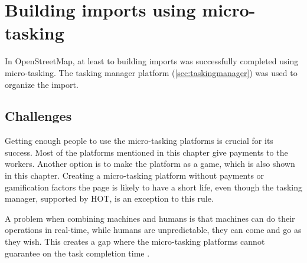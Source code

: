 
\section{Building imports using micro-tasking}
In OpenStreetMap, at least to building imports was successfully completed using micro-tasking. The tasking manager platform (\ref{sec:taskingmanager}) was used to organize the import. 


\subsection{Challenges}
Getting enough people to use the micro-tasking platforms is crucial for its success. Most of the platforms mentioned in this chapter give payments to the workers. Another option is to make the platform as a game, which is also shown in this chapter. Creating a micro-tasking platform without payments or gamification factors the page is likely to have a short life, even though the tasking manager, supported by HOT, is an exception to this rule. 

A problem when combining machines and humans is that machines can do their operations in real-time, while humans are unpredictable, they can come and go as they wish. This creates a gap where the micro-tasking platforms cannot guarantee on the task completion time \citep{Difallah2016}. 

